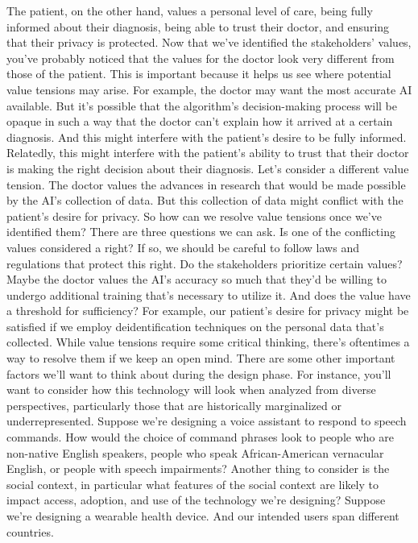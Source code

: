 The patient, on the other hand, values a personal level of care,
being fully informed about their diagnosis,
being able to trust their doctor, and ensuring
that their privacy is protected.
Now that we've identified the stakeholders' values,
you've probably noticed that the values for the doctor
look very different from those of the patient.
This is important because it helps us see where potential value tensions may
arise.
For example, the doctor may want the most accurate AI available.
But it's possible that the algorithm's decision-making process
will be opaque in such a way that the doctor can't explain
how it arrived at a certain diagnosis.
And this might interfere with the patient's desire to be fully informed.
Relatedly, this might interfere with the patient's ability
to trust that their doctor is making the right decision about their diagnosis.
Let's consider a different value tension.
The doctor values the advances in research
that would be made possible by the AI's collection of data.
But this collection of data might conflict
with the patient's desire for privacy.
So how can we resolve value tensions once we've identified them?
There are three questions we can ask.
Is one of the conflicting values considered a right?
If so, we should be careful to follow laws and regulations that
protect this right.
Do the stakeholders prioritize certain values?
Maybe the doctor values the AI's accuracy so much
that they'd be willing to undergo additional training that's
necessary to utilize it.
And does the value have a threshold for sufficiency?
For example, our patient's desire for privacy
might be satisfied if we employ deidentification techniques
on the personal data that's collected.
While value tensions require some critical thinking,
there's oftentimes a way to resolve them if we keep an open mind.
There are some other important factors we'll want
to think about during the design phase.
For instance, you'll want to consider how this technology will
look when analyzed from diverse perspectives, particularly
those that are historically marginalized or underrepresented.
Suppose we're designing a voice assistant
to respond to speech commands.
How would the choice of command phrases look
to people who are non-native English speakers, people
who speak African-American vernacular English, or people
with speech impairments?
Another thing to consider is the social context,
in particular what features of the social context
are likely to impact access, adoption, and use of the technology we're
designing?
Suppose we're designing a wearable health device.
And our intended users span different countries.
